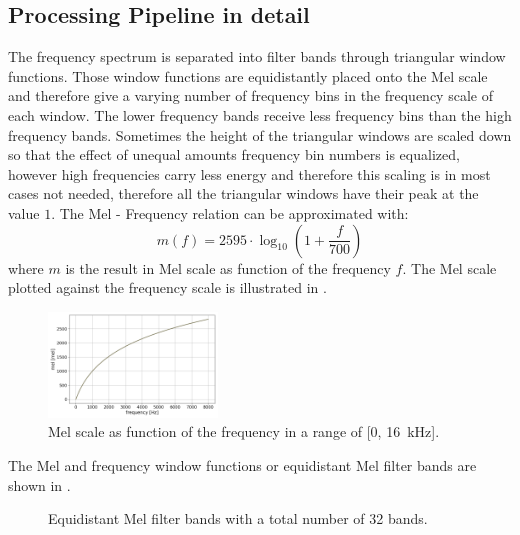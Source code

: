 
\subsection{Processing Pipeline in detail}\label{sec:signal_mfcc_pipeline}
The frequency spectrum is separated into filter bands through triangular window functions.
Those window functions are equidistantly placed onto the Mel scale and therefore give a varying number of frequency bins in the frequency scale of each window.
The lower frequency bands receive less frequency bins than the high frequency bands.
Sometimes the height of the triangular windows are scaled down so that the effect of unequal amounts frequency bin numbers is equalized, however high frequencies carry less energy and therefore this scaling is in most cases not needed, therefore all the triangular windows have their peak at the value $1$.
The Mel - Frequency relation can be approximated with:
\begin{equation}\label{eq:signal_mfcc_mel}
  m(f) = 2595 \cdot \log_{10} \left(1 + \frac{f}{700} \right) 
\end{equation}
where $m$ is the result in Mel scale as function of the frequency $f$.
The Mel scale plotted against the frequency scale is illustrated in .
\begin{figure}[!ht]
  \centering
  \includegraphics[width=0.40\textwidth]{./3_signal/figs/signal_mfcc_mel_scale}
  \caption{Mel scale as function of the frequency in a range of [0, \SI{16}{\kilo\hertz}].}
  \label{fig:signal_mfcc_mel_scale}
\end{figure}
\FloatBarrier
\noindent
The Mel and frequency window functions or equidistant Mel filter bands are shown in .
\begin{figure}[!ht]
  \centering
  \quad
  \caption{Equidistant Mel filter bands with a total number of 32 bands.}
  \label{fig:filter_bands}
\end{figure}
